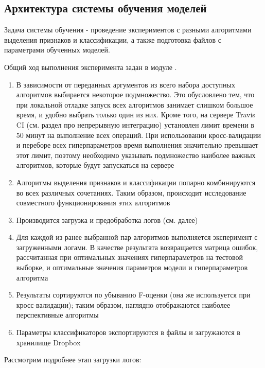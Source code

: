 \subsection{Архитектура системы обучения моделей}

Задача системы обучения - проведение экспериментов с разными алгоритмами выделения признаков и классификации, а также подготовка файлов с параметрами обученных моделей.

Общий ход выполнения эксперимента задан в модуле . 

\begin{enumerate}
\item В зависимости от переданных аргументов из всего набора доступных алгоритмов выбирается некоторое подмножество. Это обусловлено тем, что при локальной отладке запуск всех алгоритмов занимает слишком большое время, и удобно выбрать только один из них. Кроме того, на сервере Travis CI (см. раздел про непрерывную интеграцию) установлен лимит времени в 50 минут на выполнение всех операций. При использовании кросс-валидации и переборе всех гиперпараметров время выполнения значительно превышает этот лимит, поэтому необходимо указывать подмножество наиболее важных алгоритмов, которые будут запускаться на сервере
\item Алгоритмы выделения признаков и классификации попарно комбинируются во всех различных сочетаниях. Таким образом, происходит исследование совместного функционирования этих алгоритмов
\item Производится загрузка и предобработка логов (см. далее)
\item Для каждой из ранее выбранной пар алгоритмов выполняется эксперимент с загруженными логами. В качестве результата возвращается матрица ошибок, рассчитанная при оптимальных значениях гиперпараметров на тестовой выборке, и оптимальные значения параметров модели и гиперпараметров алгоритма
\item Результаты сортируются по убыванию F-оценки (она же используется при кросс-валидации); таким образом, наглядно отображаются наиболее перспективные алгоритмы
\item Параметры классификаторов экспортируются в файлы и загружаются в хранилище Dropbox
\end{enumerate}

Рассмотрим подробнее этап загрузки логов:


